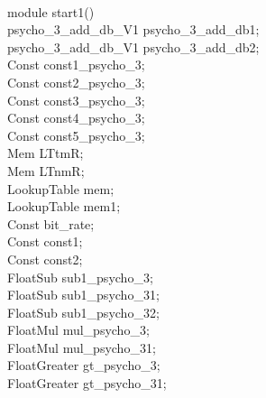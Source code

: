 \\
module start1() { \\
\hspace*{2em}psycho\_3\_add\_db\_V1 psycho\_3\_add\_db1; \\
\hspace*{2em}psycho\_3\_add\_db\_V1 psycho\_3\_add\_db2; \\
\hspace*{2em}Const const1\_psycho\_3; \\
\hspace*{2em}Const const2\_psycho\_3; \\
\hspace*{2em}Const const3\_psycho\_3; \\
\hspace*{2em}Const const4\_psycho\_3; \\
\hspace*{2em}Const const5\_psycho\_3; \\
\hspace*{2em}Mem LTtmR; \\
\hspace*{2em}Mem LTnmR; \\
\hspace*{2em}LookupTable mem; \\
\hspace*{2em}LookupTable mem1; \\
\hspace*{2em}Const bit\_rate; \\
\hspace*{2em}Const const1; \\
\hspace*{2em}Const const2; \\
\hspace*{2em}FloatSub sub1\_psycho\_3; \\
\hspace*{2em}FloatSub sub1\_psycho\_31; \\
\hspace*{2em}FloatSub sub1\_psycho\_32; \\
\hspace*{2em}FloatMul mul\_psycho\_3; \\
\hspace*{2em}FloatMul mul\_psycho\_31; \\
\hspace*{2em}FloatGreater gt\_psycho\_3; \\
\hspace*{2em}FloatGreater gt\_psycho\_31; \\
}
